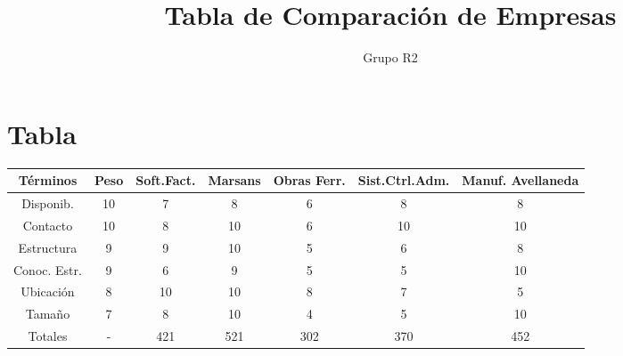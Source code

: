 \documentclass[12pt,a4paper,spanish]{article}
\begin{document}
 

\pagestyle{plain}
\title{Tabla de Comparaci\'{o}n de Empresas} 
\author{Grupo R2} 
\maketitle 
\newpage
\tableofcontents
\newpage
\section{Tabla}
\small
\begin{center}
\begin{tabular}{|| c | c | c | c | c | c | c ||}
\hline
\hline
T\'{e}rminos & Peso & Soft.Fact. & Marsans & Obras Ferr. & Sist.Ctrl.Adm. & Manuf. Avellaneda\\
\hline
Disponib.  & 10 & 7 & 8 & 6 & 8 & 8 \\
\hline
Contacto   & 10 & 8 & 10 & 6 & 10 & 10 \\
\hline
Estructura & 9 & 9 & 10 & 5 & 6 & 8 \\
\hline
Conoc. Estr. & 9 & 6 & 9 & 5 & 5 & 10 \\
\hline
Ubicaci\'{o}n & 8 & 10 & 10 & 8 & 7 & 5 \\
\hline
Tama\~{n}o   & 7 & 8 & 10 & 4 & 5 & 10 \\
\hline
\hline
Totales & - & 421 & 521 & 302 & 370 & 452 \\
\hline

\end{tabular}
\end{center}
\normalsize
\end{document}
